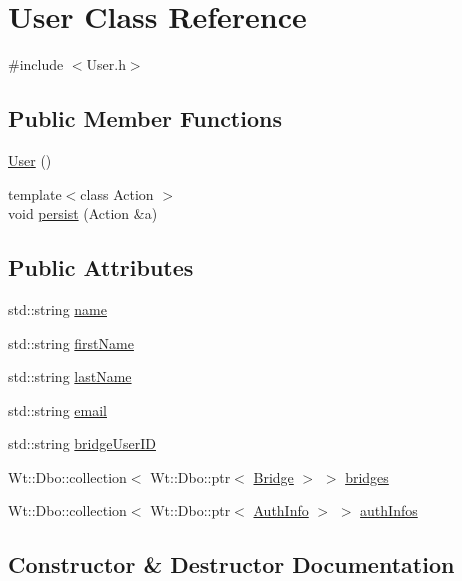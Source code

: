 \hypertarget{class_user}{}\section{User Class Reference}
\label{class_user}


{\ttfamily \#include $<$User.\+h$>$}

\subsection*{Public Member Functions}
\begin{DoxyCompactItemize}
\item 
\hyperlink{class_user_a4a0137053e591fbb79d9057dd7d2283d}{User} ()
\item 
{\footnotesize template$<$class Action $>$ }\\void \hyperlink{class_user_a626b516f8e54e0b98c4b20c488de01b8}{persist} (Action \&a)
\end{DoxyCompactItemize}
\subsection*{Public Attributes}
\begin{DoxyCompactItemize}
\item 
std\+::string \hyperlink{class_user_a085d8d69282b6298964eab8351584536}{name}
\item 
std\+::string \hyperlink{class_user_aa845739b31aaf9d2e7bdedf829447191}{first\+Name}
\item 
std\+::string \hyperlink{class_user_a10abe0efedb0a600a7be16593a448b12}{last\+Name}
\item 
std\+::string \hyperlink{class_user_ac35b7c63228119cb91acdbd7ed32b8cb}{email}
\item 
std\+::string \hyperlink{class_user_aab2b993a0e6512bed3f637338f48d9ac}{bridge\+User\+ID}
\item 
Wt\+::\+Dbo\+::collection$<$ Wt\+::\+Dbo\+::ptr$<$ \hyperlink{class_bridge}{Bridge} $>$ $>$ \hyperlink{class_user_a19170eac8428770570d1e0b826562131}{bridges}
\item 
Wt\+::\+Dbo\+::collection$<$ Wt\+::\+Dbo\+::ptr$<$ \hyperlink{_user_8h_a3c0a51912624b328e151e753cb0d1dd3}{Auth\+Info} $>$ $>$ \hyperlink{class_user_ae3f58fe31642f514288705f4081031b6}{auth\+Infos}
\end{DoxyCompactItemize}


\subsection{Constructor \& Destructor Documentation}
\mbox{\label{class_user_a4a0137053e591fbb79d9057dd7d2283d}} 
